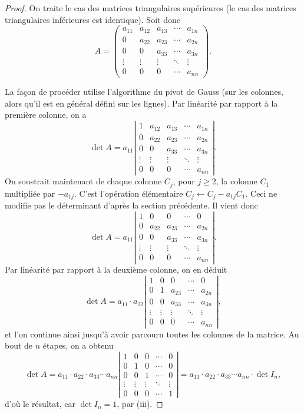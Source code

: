 \documentclass[class=report,crop=false]{standalone}
\begin{document}
\begin{proof}
On traite le cas des matrices triangulaires supérieures
(le cas des matrices triangulaires inférieures est identique). Soit donc
$$A=\begin{pmatrix}
{a_{11}}&a_{12}&a_{13}&\cdots&a_{1n}\\
0&{a_{22}}&a_{23}&\cdots&a_{2n}\\
0&0&{a_{33}}&\cdots&a_{3n}\\
\vdots&\vdots&\vdots&\ddots&\vdots\\
0&0&0&\cdots&{a_{nn}}
\end{pmatrix}.
$$

La façon de procéder utilise l'algorithme du pivot de Gauss (sur les colonnes, alors qu'il est en général défini sur les lignes).
Par linéarité par rapport à la première colonne, on a
$$\det A=a_{11}\left|\begin{matrix}
1&a_{12}&a_{13}&\cdots&a_{1n}\\
0&{a_{22}}&a_{23}&\cdots&a_{2n}\\
0&0&{a_{33}}&\cdots&a_{3n}\\
\vdots&\vdots&\vdots&\ddots&\vdots\\
0&0&0&\cdots&{a_{nn}}
\end{matrix}\right|.$$
On soustrait maintenant de chaque colonne $C_j$, pour $j\ge 2$, la colonne $C_1$ multipliée
par $-a_{1j}$.
C'est l'opération élémentaire $C_j \leftarrow C_j - a_{1j}C_1$. Ceci ne modifie pas le
déterminant d'après la section précédente. Il vient donc
$$\det A=a_{11}\left|\begin{matrix}
1&0&0&\cdots&0\\
0&{a_{22}}&a_{23}&\cdots&a_{2n}\\
0&0&{a_{33}}&\cdots&a_{3n}\\
\vdots&\vdots&\vdots&\ddots&\vdots\\
0&0&0&\cdots&{a_{nn}}
\end{matrix}\right|.$$
Par linéarité par rapport à la deuxième colonne, on en déduit
$$\det A=a_{11} \cdot a_{22}\left|\begin{matrix}
1&0&0&\cdots&0\\
0&1&a_{23}&\cdots&a_{2n}\\
0&0&{a_{33}}&\cdots&a_{3n}\\
\vdots&\vdots&\vdots&\ddots&\vdots\\
0&0&0&\cdots&{a_{nn}}
\end{matrix}\right|,$$
et l'on continue ainsi jusqu'à avoir parcouru toutes les colonnes de la matrice. Au bout de $n$ étapes, on a obtenu
$$\det A=a_{11} \cdot a_{22} \cdot a_{33}\cdots{a_{nn}}\left|\begin{matrix}
1&0&0&\cdots&0\\
0&1&0&\cdots&0\\
0&0&1&\cdots&0\\
\vdots&\vdots&\vdots&\ddots&\vdots\\
0&0&0&\cdots&1
\end{matrix}\right|=
a_{11} \cdot a_{22} \cdot a_{33}\cdots{a_{nn}} \cdot \det I_n,$$
d'où le résultat, car $\det I_n = 1$, par (iii).
\end{proof}
\end{document}
